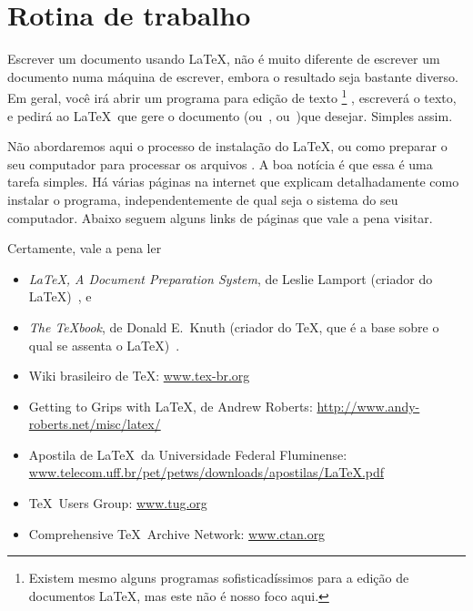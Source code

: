 \section{Rotina de trabalho}

Escrever um documento usando \LaTeX, não é muito diferente de escrever
um documento numa máquina de escrever, embora o resultado seja
bastante diverso. Em geral, você irá abrir um programa para edição
de texto%
\footnote{%
  Existem mesmo alguns programas sofisticadíssimos
  para a edição de documentos \LaTeX, mas este não é nosso foco
  aqui.}%
, escreverá o texto, e pedirá ao \LaTeX\ que gere o
documento  (ou~, ou~)que
desejar. Simples assim.

Não abordaremos aqui o processo de instalação do \LaTeX, ou como
preparar o seu computador para processar os arquivos . A
boa notícia é que essa é uma tarefa simples. Há várias páginas na
internet que explicam detalhadamente como instalar o programa,
independentemente de qual seja o sistema do seu computador. Abaixo seguem
alguns links de páginas que vale a pena visitar.

Certamente, vale a pena ler 
\begin{itemize}
\item \emph{\LaTeX, A Document Preparation System}, de Leslie Lamport
  (criador do \LaTeX)~\cite{lamport},
  e
\item \emph{The \TeX book}, de Donald E.~Knuth (criador do \TeX, que é
  a base sobre o qual se assenta o \LaTeX)~\cite{texbook}.
\item Wiki brasileiro de \TeX: \url{www.tex-br.org}
\item Getting to Grips with \LaTeX, de Andrew Roberts: \url{http://www.andy-roberts.net/misc/latex/}
\item Apostila de \LaTeX\ da Universidade Federal Fluminense: \url{www.telecom.uff.br/pet/petws/downloads/apostilas/LaTeX.pdf}
\item \TeX\ Users Group: \url{www.tug.org}
\item Comprehensive \TeX\ Archive Network: \url{www.ctan.org}
\end{itemize}
